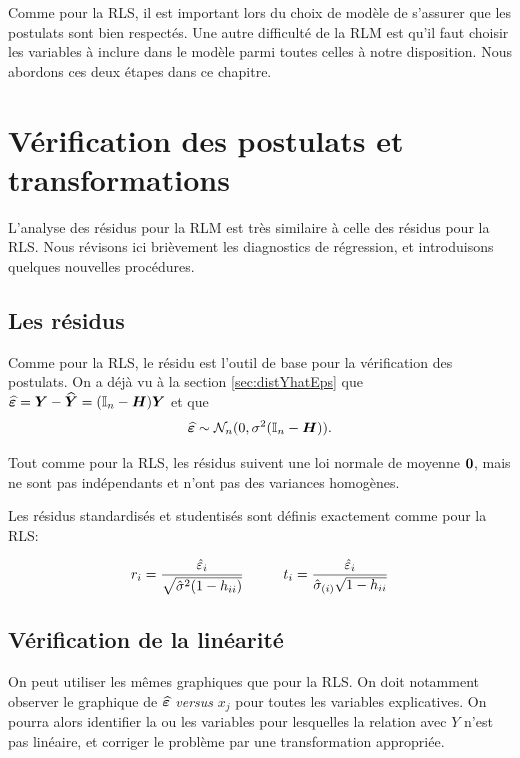 %


Comme pour la RLS, il est important lors du choix de modèle de s'assurer que les postulats sont bien respectés. Une autre difficulté de la RLM est qu'il faut choisir les variables à inclure dans le modèle parmi toutes celles à notre disposition. Nous abordons ces deux étapes dans ce chapitre.

\section{Vérification des postulats et transformations}

L'analyse des résidus pour la RLM est très similaire à celle des résidus pour la RLS. Nous révisons ici brièvement les diagnostics de régression, et introduisons quelques nouvelles procédures.

\subsection{Les résidus}

Comme pour la RLS, le résidu est l'outil de base pour la vérification des postulats. On a déjà vu à la section \ref{sec:distYhatEps} que $\widehat{\bm\varepsilon}=\bm{Y}-\widehat{\bm{Y}}=(\bm{\mathbb{I}}_n-\bm{H})\bm{Y}$ et que
\begin{eqnarray*}
	\widehat{\bm\varepsilon} \sim \mathcal{N}_n(0, \sigma^2(\bm{\mathbb{I}}_n-\bm{H})).
\end{eqnarray*}

Tout comme pour la RLS, les résidus suivent une loi normale de moyenne $\bm{0}$, mais ne sont pas indépendants et n'ont pas des variances homogènes.

Les résidus standardisés et studentisés sont définis exactement comme pour la RLS:

$$r_i = \dfrac{\hat\varepsilon_i}{\sqrt{\hat\sigma^2(1-h_{ii})}}
\hspace{1cm}
t_i={\hat\varepsilon_i\over \hat{\sigma}_{(i)} \sqrt{1-h_{ii}}}$$



\subsection{Vérification de la linéarité}

On peut utiliser les mêmes graphiques que pour la RLS. On doit notamment observer le graphique de  $\widehat{\bm\varepsilon}$ \textit{versus} $x_j$ pour toutes les variables explicatives. On pourra alors identifier la ou les variables pour lesquelles la relation avec $Y$ n'est pas linéaire, et corriger le problème par une transformation appropriée.

